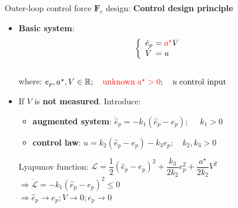 \documentclass{beamer}
\begin{document}
\begin{frame}{Outer-loop control force $\mathbf{F}_c$ design: {\bf \color{red} Control design principle}}
\begin{itemize}
	\item \textbf{Basic system}: 
	\begin{equation*}
	\left\{
	\begin{array}{ll}
	\dot {{e}}_p &\!\!\!\!= {\color{red} a^\star} V \\
	\dot{{V}}&\!\!\!\!=  u
	\end{array}\right. \vspace{-0.15cm}
	\end{equation*}\\
	where: $e_p, a^\star, V \in \mathbb{R};{\color{red} \quad \text{unknown}\; a^\star    >0}; \quad u \; \text{control input}$
	\vspace{1cm}
	\item If $V$ is \textbf{{\color{red} not}  measured}. 
	\pause
	Introduce:
	\begin{itemize}
		\item  {\color{red}\textbf{augmented system}: $\dot{\hat{e}}_p = - k_1(\hat{e}_p - e_p);$} $\quad  k_1 >0$
		\item \textbf{control law}: $u = k_2(\hat{e}_p - e_p) - k_3 e_p; \quad k_2, k_3 >0 $ 
	\end{itemize}
	\pause
	Lyapunov function: 
	$\mathcal{L} = \dfrac{1}{2} (\hat{e}_p - e_p)^2 + \dfrac{k_3}{2k_2} e^2_p + \dfrac{a^\star}{2k_2} V^2
	$ \\
	$\Rightarrow \dot{\mathcal{L}} = -k_1 (\hat{e}_p - e_p)^2 \le 0$\\
	$\Rightarrow \hat{e}_p \rightarrow e_p; V \rightarrow 0; e_p \rightarrow 0$		
\end{itemize}
\end{frame}
\end{document}
